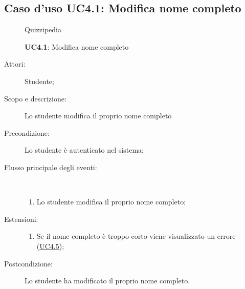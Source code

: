 \subsection{Caso d'uso UC4.1: Modifica nome completo}
	\begin{figure}[H]
		\centering
		\begin{resizedtikzpicture}{\textwidth}
		\begin{umlsystem}[x=0, fill=lightgray!20]{Quizzipedia}
		\end{umlsystem}
		\end{resizedtikzpicture}
		\caption{\textbf{UC4.1}: Modifica nome completo}
		\label{UC4.1}
	\end{figure}
\begin{description}
\item[Attori:] Studente;
\item[Scopo e descrizione:] Lo studente modifica il proprio nome completo
      \item[Precondizione:] Lo studente è autenticato nel sistema;

        \item[Flusso principale degli eventi:] \ 
 \begin{enumerate}
          \item Lo studente modifica il proprio nome completo;

      \end{enumerate}
    \item[Estensioni:]
      \begin{enumerate}
          \item Se il nome completo è troppo corto viene visualizzato un errore (\hyperlink{UC4.5}{UC4.5});

      \end{enumerate}
    \item[Postcondizione:] Lo studente ha modificato il proprio nome completo.
  \end{description}
\hypertarget{UC4.2}{}
